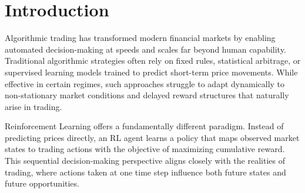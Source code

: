 \documentclass[12pt]{report}
\begin{document}
\begin{abstract}
Reinforcement Learning (RL) has emerged as a powerful framework for sequential decision-making under uncertainty, making it a natural candidate for applications in algorithmic trading and quantitative finance. This project presents the systematic design, implementation, and conceptual evaluation of a Reinforcement Learning--based trading agent trained on historical financial market data. The work is structured as a progressive learning and development pipeline, beginning with foundational numerical computing tools in Python, advancing through theoretical reinforcement learning constructs such as multi-armed bandits and Markov Decision Processes (MDPs), and culminating in the construction of a custom trading environment with a tabular Q-learning agent.

The primary contribution of this project lies not in achieving state-of-the-art trading performance, but in rigorously formulating the trading problem as an MDP, designing a principled reward structure, and critically examining the limitations and risks inherent in RL-driven financial systems. Emphasis is placed on interpretability, reproducibility, and methodological clarity, making the project suitable for academic evaluation, research internships, and technical portfolios. The report situates the developed system within existing reinforcement learning and financial market literature, discusses design trade-offs, and outlines future directions toward more realistic and robust trading agents.
\end{abstract}

\chapter{Introduction}

Algorithmic trading has transformed modern financial markets by enabling automated decision-making at speeds and scales far beyond human capability. Traditional algorithmic strategies often rely on fixed rules, statistical arbitrage, or supervised learning models trained to predict short-term price movements. While effective in certain regimes, such approaches struggle to adapt dynamically to non-stationary market conditions and delayed reward structures that naturally arise in trading.

Reinforcement Learning offers a fundamentally different paradigm. Instead of predicting prices directly, an RL agent learns a policy that maps observed market states to trading actions with the objective of maximizing cumulative reward. This sequential decision-making perspective aligns closely with the realities of trading, where actions taken at one time step influence both future states and future opportunities.
\end{document}
